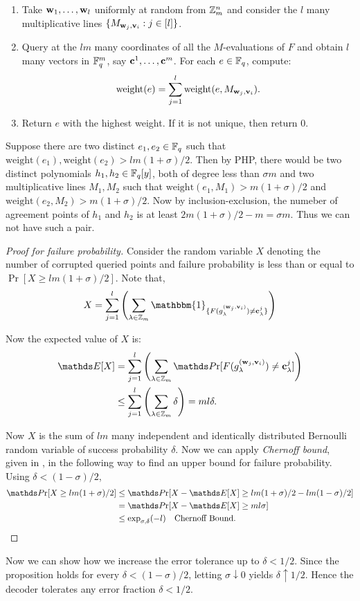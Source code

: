 \begin{enumerate}
    \item Take $\mathbf{w}_1,\ldots,\mathbf{w}_l$ uniformly at random from $\mathbb{Z}_m^n$ and consider the $l$ many multiplicative lines $\{M_{\mathbf{w}_j, \mathbf{v}_i} : j\in[l]\}$.
    \item Query at the $lm$ many coordinates of all the $M$-evaluations of $F$ and obtain $l$ many vectors in $\mathbb{F}_q^m$, say $\mathbf{c}^1,\ldots,\mathbf{c}^m$. For each $e\in\mathbb{F}_q$, compute:
    \[
        \mathrm{weight}(e) = \sum_{j=1}^{l}\mathrm{weight}(e,M_{\mathbf{w}_j, \mathbf{v}_i}).
    \]
    \item Return $e$ with the highest weight. If it is not unique, then return $0$.
\end{enumerate}

\begin{observation}
        Suppose there are two distinct $e_1,e_2\in\mathbb{F}_q$ such that $\mathrm{weight}(e_1), \mathrm{weight}(e_2)>lm(1+\sigma)/2$. Then by PHP, there would be two distinct polynomials $h_1, h_2\in\mathbb{F}_q[y]$, both of degree less than $\sigma m$ and two multiplicative lines $M_1, M_2$ such that $\mathrm{weight}(e_1,M_1)>m(1+\sigma)/2$ and $\mathrm{weight}(e_2,M_2)>m(1+\sigma)/2$. Now by inclusion-exclusion, the numeber of agreement points of $h_1$ and $h_2$ is at least $2m(1+\sigma)/2 - m = \sigma m$. Thus we can not have such a pair.
    \end{observation}

\begin{proof}[Proof for failure probability]
    Consider the random variable $X$ denoting the number of corrupted queried points and failure probability is less than or equal to $\Pr[X\geq lm(1+\sigma)/2]$. Note that, 
    \[
        X = \sum_{j = 1}^{l}\left( \sum_{\lambda\in\bbz_m} 
\mathbbm{1}_{\{F(g^{(\bfw_j,\bfv_i)}_\lambda)\neq \bfc^j_{\lambda}\}}
\right)
    \]

    Now the expected value of $X$ is:
    \begin{align*}
    \E[X]
    &= \sum_{j = 1}^{l}\left( \sum_{\lambda\in\bbz_m} 
    \Pr[F(g^{(\bfw_j,\bfv_i)}_\lambda)\neq \bfc^j_{\lambda}]
    \right)\\
    &\leq \sum_{j = 1}^{l}\left( \sum_{\lambda\in\bbz_m} \delta \right) = ml\delta.
\end{align*}

Now $X$ is the sum of $lm$ many independent and identically distributed Bernoulli random variable of success probability $\delta$. Now we can apply \emph{Chernoff bound}, given in \cite{Alon2000}, in the following way to find an upper bound for failure probability. Using $\delta<(1 - \sigma)/2$,
\begin{align*}
    \Pr[X\geq lm(1+\sigma)/2] 
    & \leq \Pr[X - \E[X] \geq lm(1+\sigma)/2 - lm(1 - \sigma)/2] \\
    &  = \Pr[X - \E[X]\geq ml\sigma] \\
    & \leq \exp_{\sigma, \delta}(-l) \quad \text{Chernoff Bound}. 
\end{align*}
\end{proof}

Now we can show how we increase the error tolerance up to $\delta < 1/2$. Since the proposition holds for every $\delta < (1-\sigma)/2$, letting $\sigma \downarrow 0$ yields $\delta \uparrow 1/2$. Hence the decoder tolerates any error fraction $\delta < 1/2$.  
